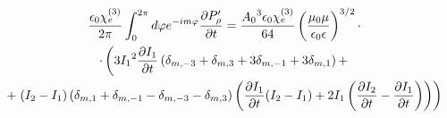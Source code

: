 \begin{equation*} \begin{gathered}
\frac{\epsilon_0 \chi_e^{(3)}}{2 \pi} \int_{0}^{2\pi} d \varphi 
e^{-im \varphi} \frac{\partial P_\rho^\prime}{\partial t} = 
\frac{ {A_0}^3 \epsilon_0 \chi_e^{(3)}}{ 64 } 
\left( \frac{\mu_0 \mu} {\epsilon_0 \epsilon} \right)^{3/2} \cdot \\ 
\cdot \left( 3 {I_1}^2 \frac{\partial I_1}{\partial t} \left( \delta_{m,-3} + 
\delta_{m,3} + 3 \delta_{m,-1} + 3 \delta_{m,1} \right) + \right. \\
+ \left. ( I_2 - I_1 ) \left( \delta_{m,1} + \delta_{m,-1} - 
\delta_{m,-3} - \delta_{m,3} \right) \left( 
\frac{\partial I_1}{\partial t} ( I_2 - I_1 ) + 2 I_1 \left( \frac{\partial I_2}{\partial t} - 
\frac{\partial I_1}{\partial t} \right) \right) \right)
\end{gathered}   \end{equation*}

%
%

